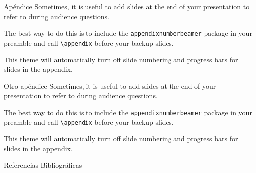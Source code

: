 \documentclass[10pt]{beamer}
\begin{document}
\begin{frame}[fragile]{Apéndice}
  Sometimes, it is useful to add slides at the end of your presentation to
  refer to during audience questions.

  The best way to do this is to include the \verb|appendixnumberbeamer|
  package in your preamble and call \verb|\appendix| before your backup slides.

  This theme will automatically turn off slide numbering and progress bars for slides in the appendix.
\end{frame}

\begin{frame}[fragile]{Otro apéndice}
  Sometimes, it is useful to add slides at the end of your presentation to
  refer to during audience questions.

  The best way to do this is to include the \verb|appendixnumberbeamer|
  package in your preamble and call \verb|\appendix| before your backup slides.

  This theme will automatically turn off slide numbering and progress bars for slides in the appendix.
\end{frame}

\begin{frame}[allowframebreaks]{Referencias Bibliográficas}
  
  
\end{frame}
\end{document}
